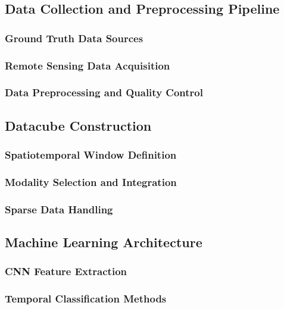 \documentclass[conference]{IEEEtran}
\begin{document}
\subsection{Data Collection and Preprocessing Pipeline}

\subsubsection{Ground Truth Data Sources}

\subsubsection{Remote Sensing Data Acquisition}

\subsubsection{Data Preprocessing and Quality Control}

\subsection{Datacube Construction}

\subsubsection{Spatiotemporal Window Definition}

\subsubsection{Modality Selection and Integration}

\subsubsection{Sparse Data Handling}

\subsection{Machine Learning Architecture}

\subsubsection{CNN Feature Extraction}

\subsubsection{Temporal Classification Methods}
\end{document}
